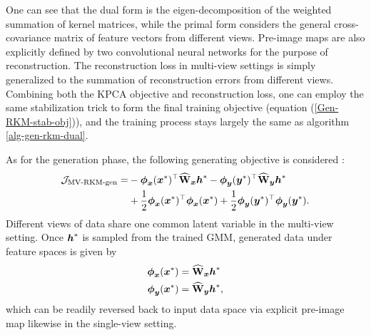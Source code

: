 One can see that the dual form is the eigen-decomposition of the weighted summation of kernel matrices, while the primal form considers the general cross-covariance matrix of feature vectors from different views. Pre-image maps are also explicitly defined by two convolutional neural networks for the purpose of reconstruction. The reconstruction loss in multi-view settings is simply generalized to the summation of reconstruction errors from different views. Combining both the KPCA objective and reconstruction loss, one can employ the same stabilization trick to form the final training objective (equation (\ref{Gen-RKM-stab-obj})), and the training process stays largely the same as algorithm \ref{alg-gen-rkm-dual}.

As for the generation phase, the following generating objective is considered :
\begin{equation}
    \begin{aligned}
    \mathcal{J}_{\text{MV-RKM-gen}} = &-\boldsymbol{\phi}_{\boldsymbol{x}}(\boldsymbol{x}^{*})^\top\widehat{\mathbf{W}}_{\boldsymbol{x}}\boldsymbol{h}^{*}-\boldsymbol{\phi}_{\boldsymbol{y}}(\boldsymbol{y}^{*})^\top\widehat{\mathbf{W}}_{\boldsymbol{y}}\boldsymbol{h}^{*} \\ 
    &+ \frac{1}{2}\boldsymbol{\phi}_{\boldsymbol{x}}(\boldsymbol{x}^*)^{\top}\boldsymbol{\phi}_{\boldsymbol{x}}(\boldsymbol{x}^*)+ \frac{1}{2}\boldsymbol{\phi}_{\boldsymbol{y}}(\boldsymbol{y}^*)^{\top}\boldsymbol{\phi}_{\boldsymbol{y}}(\boldsymbol{y}^*).
    \end{aligned}
\end{equation}
Different views of data share one common latent variable in the multi-view setting. Once $\boldsymbol{h}^{*}$ is sampled from the trained GMM, generated data under feature spaces is given by
\begin{equation}
    \begin{aligned}
        \boldsymbol{\phi}_{\boldsymbol{x}}(\boldsymbol{x}^{*}) &= \widehat{\mathbf{W}}_{\boldsymbol{x}}\boldsymbol{h}^{*} \\
         \boldsymbol{\phi}_{\boldsymbol{y}}(\boldsymbol{x}^{*}) &= \widehat{\mathbf{W}}_{\boldsymbol{y}}\boldsymbol{h}^{*},
    \end{aligned}
\end{equation}
which can be readily reversed back to input data space via explicit pre-image map likewise in the single-view setting.

